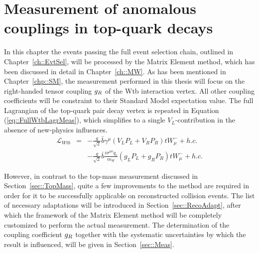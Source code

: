 \chapter{Measurement of anomalous couplings in top-quark decays} \label{ch::Analysis}

In this chapter the events passing the full event selection chain, outlined in Chapter~\ref{ch::EvtSel}, will be processed by the Matrix Element method, which has been discussed in detail in Chapter~\ref{ch::MW}. As has been mentioned in Chapter~\ref{chp::SM}, the measurement performed in this thesis will focus on the right-handed tensor coupling $g_{R}$ of the Wtb interaction vertex. All other coupling coefficients will be constraint to their Standard Model expectation value. The full Lagrangian of the top-quark pair decay vertex is repeated in Equation (\ref{eq::FullWtbLagrMeas}), which simplifies to a single $V_L$-contribution in the absence of new-physics influences.
\begin{eqnarray} \label{eq::FullWtbLagrMeas}
  \mathcal{L}_{Wtb} & = & - \frac{g}{\sqrt{2}} \bar{b} \gamma^{\mu} \left( V_L P_L + V_R P_R \right) t W_{\mu}^{-} + h.c. \nonumber \\
		    &   & - \frac{g}{\sqrt{2}} \bar{b} \frac{i\sigma^{\mu \nu} q_{\nu}}{m_{W}} \left( g_L P_L + g_R P_R \right) t W_{\mu}^{-} + h.c.
\end{eqnarray}

However, in contrast to the top-mass measurement discussed in Section~\ref{sec::TopMass}, quite a few improvements to the method are required in order for it to be successfully applicable on reconstructed collision events.
The list of necessary adaptations will be introduced in Section~\ref{sec::RecoAdapt}, after which the framework of the Matrix Element method will be completely customized to perform the actual measurement. 
The determination of the coupling coefficient $g_{R}$ together with the systematic uncertainties by which the result is influenced, will be given in Section~\ref{sec::Meas}.

